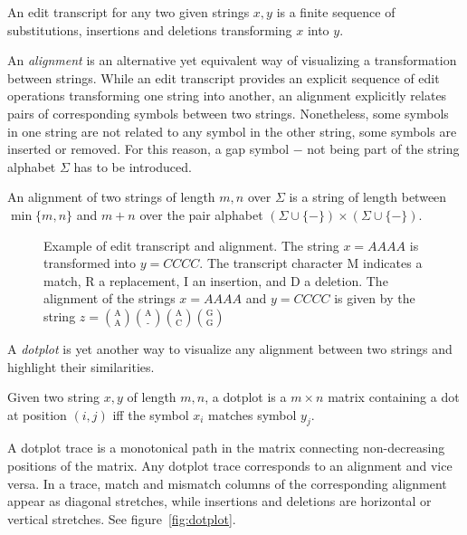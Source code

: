 \begin{definition}
\label{def:alignment}
An edit transcript for any two given strings $x,y$ is a finite sequence of substitutions, insertions and deletions transforming $x$ into $y$.
\end{definition}

An \emph{alignment} is an alternative yet equivalent way of visualizing a transformation between strings.
While an edit transcript provides an explicit sequence of edit operations transforming one string into another, an alignment explicitly relates pairs of corresponding symbols between two strings.
Nonetheless, some symbols in one string are not related to any symbol in the other string, \ie some symbols are inserted or removed.
For this reason, a gap symbol $-$ not being part of the string alphabet $\Sigma$ has to be introduced.

\begin{definition}
\label{def:alignment}
An alignment of two strings of length $m,n$ over $\Sigma$ is a string of length between $\min\{m,n\}$ and $m+n$ over the pair alphabet $(\Sigma \cup \{ - \}) \times (\Sigma \cup \{ - \})$.
\end{definition}

\begin{figure}[h]
\begin{center}
\caption[Example of edit transcript and alignment]{Example of edit transcript and alignment. The string $x=AAAA$ is transformed into $y=CCCC$. The transcript character M indicates a match, R a replacement, I an insertion, and D a deletion.
The alignment of the strings $x=AAAA$ and $y=CCCC$ is given by the string
$z={\text{A} \choose \text{A}}{\text{A} \choose \text{-}}{\text{A} \choose \text{C}}{\text{G} \choose \text{G}}$
}
\label{fig:edit-transcript}

\end{center}
\end{figure}

A \emph{dotplot} is yet another way to visualize any alignment between two strings and highlight their similarities.
\begin{definition}
\label{def:dotplot}
Given two string $x,y$ of length $m,n$, a dotplot is a $m \times n$ matrix containing a dot at position $(i,j)$ iff the symbol $x_i$ matches symbol $y_j$.
\end{definition}
A dotplot trace is a monotonical path in the matrix connecting non-decreasing positions of the matrix.
Any dotplot trace corresponds to an alignment and vice versa.
In a trace, match and mismatch columns of the corresponding alignment appear as diagonal stretches, while insertions and deletions are horizontal or vertical stretches.
See figure~\ref{fig:dotplot}.

